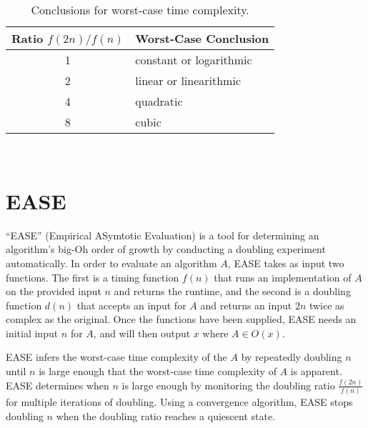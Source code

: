 \documentclass[10pt,twocolumn]{article}
\newcommand{\toolname}{{\sc EASE}\xspace}
\begin{document}
\begin{table}[h!]
  \vspace*{-.15in}
  \begin{center}
    \begin{tabular}{c|l}
      Ratio $f(2n)/f(n)$ & Worst-Case Conclusion              \\ \hline
      1                  & constant or logarithmic \\
      2                  & linear or linearithmic  \\
      4                  & quadratic               \\
      8                  & cubic                   \\
    \end{tabular}
  \end{center}
  \vspace*{-.25in}

  \caption{Conclusions for worst-case time complexity.}~\label{table:ratios}
  \vspace*{-.35in}

\end{table}

\section{\toolname}
    ``\toolname'' (Empirical ASymtotic Evaluation) \cite{kinneer2015,tool} is a tool for
    determining an algorithm's big-Oh order of growth by
    conducting a doubling experiment automatically.  In order to
    evaluate an algorithm $A$, \toolname takes as input two
    functions. The first is a timing function $f(n)$ that runs an
    implementation of $A$ on the provided input $n$ and returns
    the runtime, and the second is a doubling function $d(n)$ that
    accepts an input for $A$ and returns an input $2n$ twice as
    complex as the original. Once the functions have been supplied,
    \toolname needs an initial input $n$ for $A$, and will then 
    output $x$ where $A \in O(x)$.

    \toolname infers the worst-case time complexity of the $A$ by
    repeatedly doubling $n$ until $n$ is large enough that the
    worst-case time complexity of $A$ is apparent.  \toolname
    determines when $n$ is large enough by monitoring the doubling
    ratio $\frac{f(2n)}{f(n)}$ for multiple iterations of doubling.
    Using a convergence algorithm, \toolname stops doubling $n$
    when the doubling ratio reaches a quiescent state.
   
\end{document}
